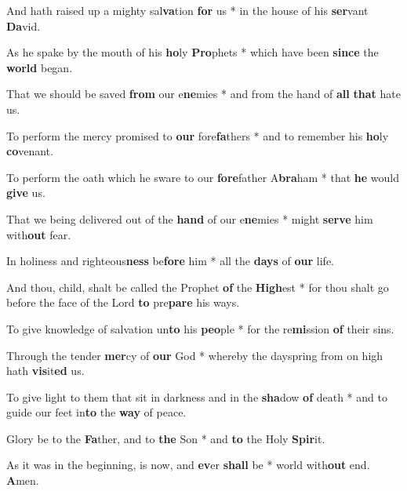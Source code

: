 \begin{multicols}{2}
	And hath raised up a mighty sal\textbf{va}tion \textbf{for} us * in the house of his \textbf{ser}vant \textbf{Da}vid.
	
	As he spake by the mouth of his \textbf{ho}ly \textbf{Pro}phets * which have been \textbf{since} the \textbf{world} began.
	
	That we should be saved \textbf{from} our e\textbf{ne}mies * and from the hand of \textbf{all} \textbf{that} hate us.
	
	To perform the mercy promised to \textbf{our} fore\textbf{fa}thers * and to remember his \textbf{ho}ly \textbf{co}venant. 
	
	To perform the oath which he sware to our \textbf{fore}father A\textbf{bra}ham * that \textbf{he} would \textbf{give} us.
	
	That we being delivered out of the \textbf{hand} of our e\textbf{ne}mies * might \textbf{serve} him with\textbf{out} fear.
	
	In holiness and righteous\textbf{ness} be\textbf{fore} him * all the \textbf{days} of \textbf{our} life.
	
	And thou, child, shalt be called the Prophet \textbf{of} the \textbf{High}est * for thou shalt go before the face of the Lord \textbf{to} pre\textbf{pare} his ways.
	
	To give knowledge of salvation un\textbf{to} his \textbf{peo}ple * for the re\textbf{mi}ssion \textbf{of} their sins.
	
	Through the tender \textbf{mer}cy of \textbf{our} God * whereby the dayspring from on high hath \textbf{vis}it\textbf{ed} us.
	
	To give light to them that sit in darkness and in the \textbf{sha}dow \textbf{of} death * and to guide our feet in\textbf{to} the \textbf{way} of peace.
	
	Glory be to the \textbf{Fa}ther, and to \textbf{the} Son * and \textbf{to} the Holy \textbf{Spir}it.
	
	As it was in the beginning, is now, and \textbf{ev}er \textbf{shall} be * world with\textbf{out} end. \textbf{A}men.
\end{multicols}
